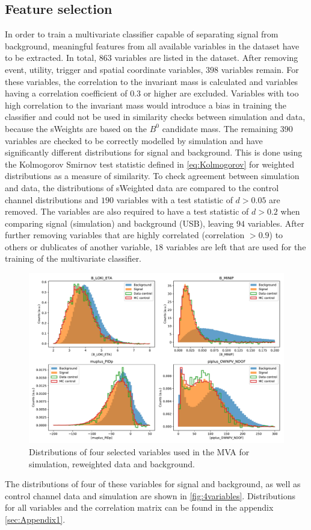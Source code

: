 \subsection{Feature selection}
In order to train a multivariate classifier capable of separating signal from background, meaningful features from all available variables in the dataset 
have to be extracted. In total, $\num{863}$ variables are listed in the dataset. After removing event, utility, trigger and spatial coordinate variables, $\num{398}$ variables remain.
For these variables, the correlation to the invariant mass is calculated and variables having a correlation coefficient of $\num{0.3}$ or higher are excluded.
Variables with too high correlation to the invariant mass would introduce a bias in training the classifier and could not be used in similarity checks between simulation and data,
because the sWeights are based on the $B^0$ candidate mass. The remaining $\num{390}$ variables are checked to be correctly modelled by simulation and have significantly different 
distributions for signal and background. This is done using the Kolmogorov Smirnov test statistic defined in \autoref{eq:Kolmogorov} for weighted distributions as a measure of similarity. 
To check agreement between simulation and data, the distributions of sWeighted data are compared to the control channel distributions and $\num{190}$ variables with a test statistic 
of $d > \num{0.05}$ are removed. The variables are also required to have a test statistic of $d > \num{0.2}$ when comparing signal (simulation) and background (USB), leaving 
$\num{94}$ variables. After further removing variables that are highly correlated (correlation $> 0.9$) to others or dublicates of another variable, $\num{18}$ variables are 
left that are used for the training of the multivariate classifier.
\begin{figure}
  \centering
  \includegraphics[width = .9\textwidth]{"content/plots/4variables.pdf"}
  \caption{Distributions of four selected variables used in the MVA for simulation, reweighted data and background.}
  \label{fig:4variables}
\end{figure}
The distributions of four of these variables for signal and background, as well as control channel data and simulation are shown in \autoref{fig:4variables}. Distributions for all
variables and the correlation matrix can be found in the appendix \ref{sec:Appendix1}.

